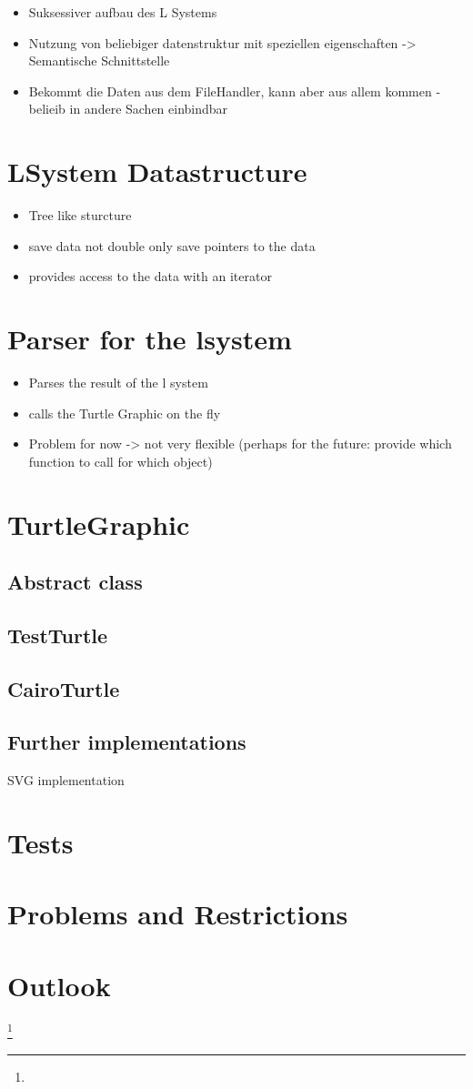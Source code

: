 \documentclass[english]{cpp-hmwk}
\begin{document}
\begin{itemize}
	\item Suksessiver aufbau des L Systems
	\item Nutzung von beliebiger datenstruktur mit speziellen eigenschaften -> Semantische Schnittstelle
	\item Bekommt die Daten aus dem FileHandler, kann aber aus allem kommen - belieib in andere Sachen einbindbar
\end{itemize}

\section{LSystem Datastructure}

\begin{itemize}
	\item Tree like sturcture
	\item save data not double only save pointers to the data
	\item provides access to the data with an iterator
\end{itemize}

\section{Parser for the lsystem}
\begin{itemize}
	\item Parses the result of the l system
	\item calls the Turtle Graphic on the fly
	
	\item Problem for now -> not very flexible (perhaps for the future: provide which function to call for which object)
\end{itemize}

\section{TurtleGraphic}
\subsection{Abstract class}
\subsection{TestTurtle}
\subsection{CairoTurtle}
\subsection{Further implementations}
SVG implementation
\section{Tests}
   \pagebreak
   \section{Problems and Restrictions}
   \section{Outlook}
   \footnote{}
\end{document}

